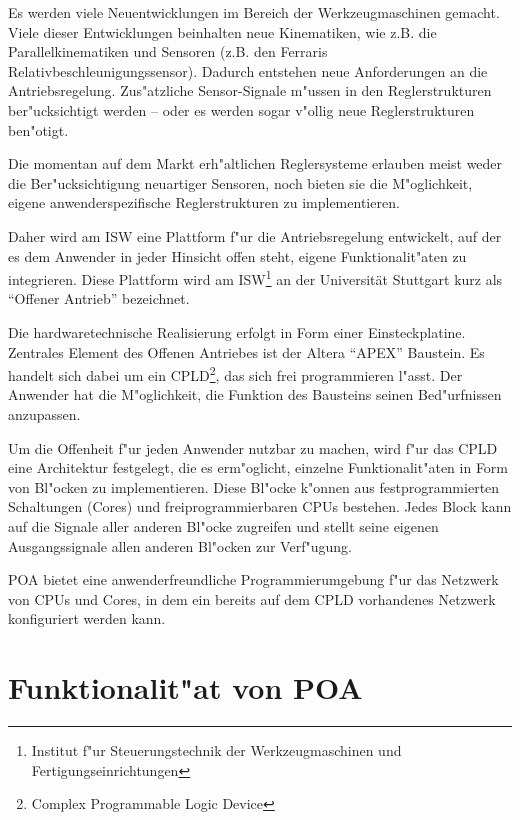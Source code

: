 \documentclass[a4paper,titlepage,12pt,ngerman]{scrbook}
\begin{document}
Es werden viele Neuentwicklungen im Bereich der Werkzeugmaschinen gemacht.
Viele dieser Entwicklungen beinhalten neue Kinematiken, wie z.B. die
Parallelkinematiken und Sensoren (z.B. den Ferraris 
Relativbeschleunigungssensor).
Dadurch entstehen neue Anforderungen an die Antriebsregelung. Zus"atzliche
Sensor-Signale m"ussen in den Reglerstrukturen ber"ucksichtigt werden -- oder
es werden sogar v"ollig neue Reglerstrukturen ben"otigt.\par
Die momentan auf dem Markt erh"altlichen Reglersysteme erlauben meist
weder die Ber"ucksichtigung neuartiger Sensoren, noch bieten sie die
M"oglichkeit, eigene anwenderspezifische Reglerstrukturen zu implementieren.\par
Daher wird am ISW eine Plattform f"ur die Antriebsregelung entwickelt,
auf der es dem Anwender in jeder Hinsicht offen steht, eigene Funktionalit"aten
zu integrieren. Diese Plattform wird am ISW\footnote{Institut f"ur Steuerungstechnik
der Werkzeugmaschinen und Fertigungseinrichtungen} an der Universität Stuttgart kurz
als ``Offener Antrieb'' bezeichnet.  \par
Die hardwaretechnische Realisierung erfolgt in Form einer Einsteckplatine.
Zentrales Element des Offenen Antriebes ist der Altera ``APEX'' Baustein. Es
handelt sich dabei um ein CPLD\footnote{Complex Programmable Logic Device},
das sich frei programmieren l"asst. Der Anwender hat die M"oglichkeit, die
Funktion des Bausteins seinen Bed"urfnissen anzupassen.\par
Um die Offenheit f"ur jeden Anwender nutzbar zu machen, wird f"ur das CPLD eine
Architektur festgelegt, die es erm"oglicht, einzelne Funktionalit"aten in Form
von Bl"ocken zu implementieren. Diese Bl"ocke k"onnen aus festprogrammierten
Schaltungen (Cores) und freiprogrammierbaren CPUs bestehen. Jedes Block kann
auf die Signale aller anderen Bl"ocke zugreifen und stellt seine eigenen
Ausgangssignale allen anderen Bl"ocken zur Verf"ugung.\par
POA bietet eine anwenderfreundliche Programmierumgebung f"ur das Netzwerk
von CPUs und Cores, in dem ein bereits auf dem CPLD vorhandenes
Netzwerk konfiguriert werden kann.\newpage




\section{Funktionalit"at von POA}
\end{document}
